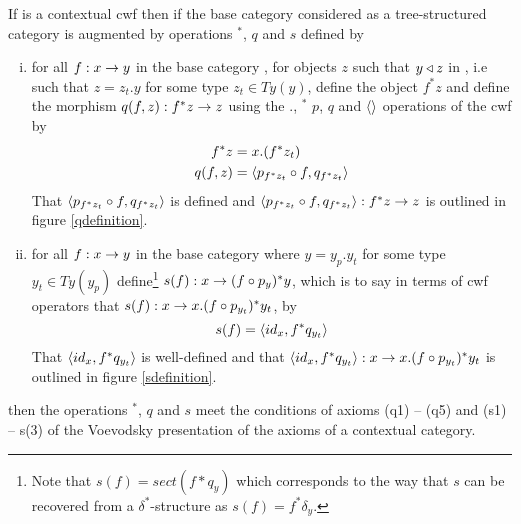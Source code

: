\begin{lemma}
If \catcw is a contextual cwf then if the base category considered as a tree-structured category is augmented  by operations $^*$, $q$ and $s$ defined by
\begin{enumerate} [(i)]
\item for all $f: x \rightarrow y$ in the base category \catcw, for objects $z$ such that $y \triangleleft z$ in \catcw, i.e such that
$z=z_t.y$ for some type $z_t \in Ty(y)$, define the object $f^*z$ 
and define the  morphism $q(f,z):f^*z \rightarrow z$  using the $.$, $^*$ $p$, $q$ and $\langle\rangle$ operations of the cwf \catcw   by
\begin{align}
f^*z    & = x.(f^*z_t) \\
q(f,z) & =\langle p_{f^*z_t} \circ f,q_{f^*z_t}\rangle
\end{align}
That $\langle p_{f^*z_t} \circ f,q_{f^*z_t}\rangle$ is defined 
and $\langle p_{f^*z_t} \circ f,q_{f^*z_t}\rangle: f^*z \rightarrow z$ is outlined in figure \ref{qdefinition}.
\item 
for all $f : x \rightarrow y$ in the base category \catcw where $y=y_p.y_t$ for some type $y_t \in Ty(y_p)$ 
define\footnote{Note that $s(f) = sect(f*q_y)$ which corresponds to the way that 
$s$ can be recovered from a $\delta^*$-structure as $s(f)=f^*\delta_y$.} $s(f):x \rightarrow (f\circ p_y)^*y$,
which is to say in terms of cwf operators that $s(f):x \rightarrow x.(f \circ p_{y_t})^*y_t$, by
\begin{equation}
s(f) = \langle id_x,f^*q_{y_t}\rangle
\end{equation}
That  $\langle id_x,f^*q_{y_t}\rangle$ is well-defined and that $\langle id_x,f^*q_{y_t}\rangle:x \rightarrow x.(f \circ p_{y_t})^*y_t$
is outlined in figure \ref{sdefinition}.
\end{enumerate}
then  the operations $^*$, $q$ and $s$ 
meet the conditions of axioms (q1) -- (q5) and (s1) -- s(3) of the Voevodsky presentation of the axioms of a contextual category.
\end{lemma}
